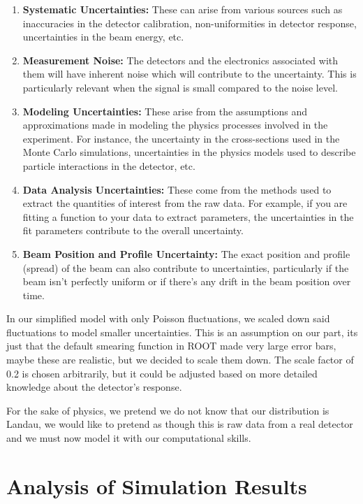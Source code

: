 \documentclass{article}
\begin{document}
\begin{enumerate}
    \item \textbf{Systematic Uncertainties:} These can arise from various sources such as inaccuracies in the detector calibration, non-uniformities in detector response, uncertainties in the beam energy, etc.
    \item \textbf{Measurement Noise:} The detectors and the electronics associated with them will have inherent noise which will contribute to the uncertainty. This is particularly relevant when the signal is small compared to the noise level.
    \item \textbf{Modeling Uncertainties:} These arise from the assumptions and approximations made in modeling the physics processes involved in the experiment. For instance, the uncertainty in the cross-sections used in the Monte Carlo simulations, uncertainties in the physics models used to describe particle interactions in the detector, etc.
    \item \textbf{Data Analysis Uncertainties:} These come from the methods used to extract the quantities of interest from the raw data. For example, if you are fitting a function to your data to extract parameters, the uncertainties in the fit parameters contribute to the overall uncertainty.
    \item \textbf{Beam Position and Profile Uncertainty:} The exact position and profile (spread) of the beam can also contribute to uncertainties, particularly if the beam isn't perfectly uniform or if there's any drift in the beam position over time.
\end{enumerate}


In our simplified model with only Poisson fluctuations, we scaled down said fluctuations to model smaller uncertainties. This is an assumption on our part, its just that the default smearing function in ROOT made very large error bars, maybe these are realistic, but we decided to scale them down. The scale factor of 0.2 is chosen arbitrarily, but it could be adjusted based on more detailed knowledge about the detector's response.

For the sake of physics, we pretend we do not know that our distribution is Landau, we would like to pretend as though this is raw data from a real detector and we must now model it with our computational skills.

\section*{Analysis of Simulation Results}
\end{document}
